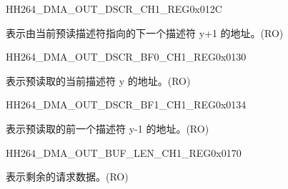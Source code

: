 \begin{register}{H}{H264\_DMA\_OUT\_DSCR\_CH1\_REG}{0x012C}\label{regdesc:H264DMAOUTDSCRCH1REG}
%
\regnewline%
\begin{regdesc}\begin{reglist}
\label{fielddesc:H264DMAOUTLINKDSCRCH1}\item [H264\_DMA\_OUTLINK\_DSCR\_CH1] 表示由当前预读描述符指向的下一个描述符 y+1 的地址。(RO)
\end{reglist}\end{regdesc}
\end{register}


\begin{register}{H}{H264\_DMA\_OUT\_DSCR\_BF0\_CH1\_REG}{0x0130}\label{regdesc:H264DMAOUTDSCRBF0CH1REG}
%
\regnewline%
\begin{regdesc}\begin{reglist}
\label{fielddesc:H264DMAOUTLINKDSCRBF0CH1}\item [H264\_DMA\_OUTLINK\_DSCR\_BF0\_CH1] 表示预读取的当前描述符 y 的地址。(RO)
\end{reglist}\end{regdesc}
\end{register}


\begin{register}{H}{H264\_DMA\_OUT\_DSCR\_BF1\_CH1\_REG}{0x0134}\label{regdesc:H264DMAOUTDSCRBF1CH1REG}
%
\regnewline%
\begin{regdesc}\begin{reglist}
\label{fielddesc:H264DMAOUTLINKDSCRBF1CH1}\item [H264\_DMA\_OUTLINK\_DSCR\_BF1\_CH1] 表示预读取的前一个描述符 y-1 的地址。(RO)
\end{reglist}\end{regdesc}
\end{register}

\begin{register}{H}{H264\_DMA\_OUT\_BUF\_LEN\_CH1\_REG}{0x0170}\label{regdesc:H264DMAOUTBUFLENCH1REG}
%
%
\regnewline%
\begin{regdesc}\begin{reglist}
\label{fielddesc:H264DMAOUTCMDFIFOBUFLENHBCH1}\item [H264\_DMA\_OUT\_CMDFIFO\_BUF\_LEN\_HB\_CH1] 表示剩余的请求数据。(RO)
\end{reglist}\end{regdesc}
\end{register}


